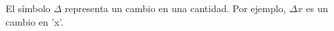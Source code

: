 \documentclass[preview]{standalone}
\begin{document}
\begin{center}
El símbolo $\Delta$ representa un cambio en una cantidad.
Por ejemplo, $\Delta x$ es un cambio en 'x'.
\end{center}
\end{document}
